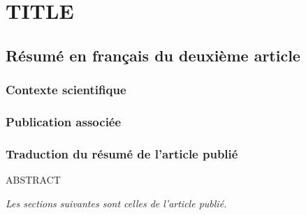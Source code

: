 \chapter{TITLE}
\label{chap2}

\section{Résumé en français du deuxième article}

\subsection{Contexte scientifique}

\subsection{Publication associée}

\subsection{Traduction du résumé de l'article publié}

ABSTRACT

\textit{Les sections suivantes sont celles de l’article publié.}
